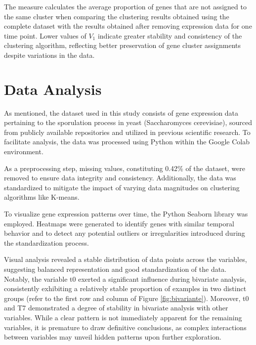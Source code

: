 \documentclass{llncs}
\begin{document}
The measure calculates the average proportion of genes that are not assigned to the same cluster when comparing the clustering results obtained using the complete dataset with the results obtained after removing expression data for one time point. Lower values of $V_1$ indicate greater stability and consistency of the clustering algorithm, reflecting better preservation of gene cluster assignments despite variations in the data.\cite{datta2003}


\section{Data Analysis}

As mentioned, the dataset used in this study consists of gene expression data pertaining to the sporulation process in yeast (Saccharomyces cerevisiae), sourced from publicly available repositories and utilized in previous scientific research. To facilitate analysis, the data was processed using Python within the Google Colab environment.

As a preprocessing step, missing values, constituting 0.42\% of the dataset, were removed to ensure data integrity and consistency. Additionally, the data was standardized to mitigate the impact of varying data magnitudes on clustering algorithms like K-means.

To visualize gene expression patterns over time, the Python Seaborn library was employed. Heatmaps were generated to identify genes with similar temporal behavior and to detect any potential outliers or irregularities introduced during the standardization process.

Visual analysis revealed a stable distribution of data points across the variables, suggesting balanced representation and good standardization of the data. Notably, the variable t0 exerted a significant influence during bivariate analysis, consistently exhibiting a relatively stable proportion of examples in two distinct groups (refer to the first row and column of Figure \ref{fig:bivariante}). Moreover, t0 and T7 demonstrated a degree of stability in bivariate analysis with other variables. While a clear pattern is not immediately apparent for the remaining variables, it is premature to draw definitive conclusions, as complex interactions between variables may unveil hidden patterns upon further exploration. 
\end{document}

